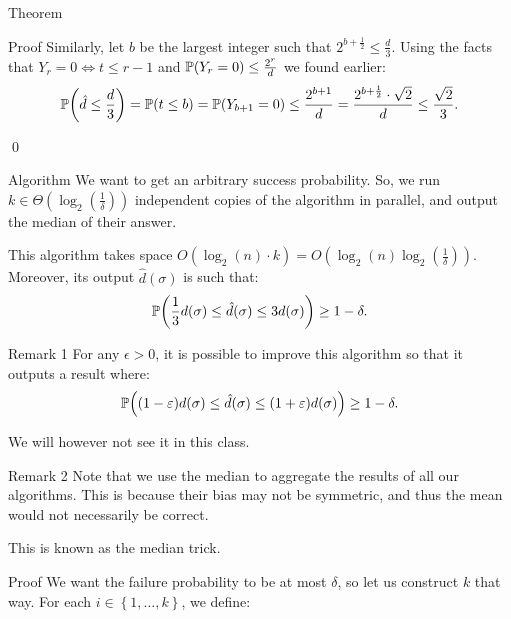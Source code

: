 \documentclass[a4paper]{article}
\begin{document}
\begin{parag}{Theorem}
\begin{subparag}{Proof}
        Similarly, let $b$ be the largest integer such that $2^{b + \frac{1}{2}} \leq \frac{d}{3}$. Using the facts that $Y_r = 0 \iff t \leq r -1$ and $\prob\left(Y_r = 0\right) \leq \frac{2^r}{d}$ we found earlier: 
        \[\prob\left(\hat{d} \leq \frac{d}{3}\right) = \prob\left(t \leq b\right) = \prob\left(Y_{b+1} = 0\right) \leq \frac{2^{b+1}}{d} = \frac{2^{b + \frac{1}{2}} \cdot \sqrt{2}}{d} \leq \frac{\sqrt{2}}{3}.\]

        \qed
    \end{subparag}
\end{parag}

\begin{parag}{Algorithm}
    We want to get an arbitrary success probability. So, we run $k \in \Theta\left(\log_2\left(\frac{1}{\delta}\right)\right)$ independent copies of the algorithm in parallel, and output the median of their answer.

    This algorithm takes space $O\left(\log_2\left(n\right)\cdot k\right) = O\left(\log_2\left(n\right) \log_2\left(\frac{1}{\delta}\right)\right)$. Moreover, its output $\hat{d}\left(\sigma\right)$ is such that: 
    \[\prob\left(\frac{1}{3} d\left(\sigma\right) \leq \hat{d}\left(\sigma\right) \leq 3 d\left(\sigma\right)\right) \geq 1- \delta.\]
    
    \begin{subparag}{Remark 1}
        For any $\epsilon > 0$, it is possible to improve this algorithm so that it outputs a result where:
        \[\prob\left(\left(1 - \epsilon\right) d\left(\sigma\right) \leq \hat{d}\left(\sigma\right) \leq \left(1 + \epsilon\right) d\left(\sigma\right)\right) \geq 1- \delta.\]

        We will however not see it in this class.
    \end{subparag}

    \begin{subparag}{Remark 2}
        Note that we use the median to aggregate the results of all our algorithms. This is because their bias may not be symmetric, and thus the mean would not necessarily be correct.

        This is known as the median trick.
    \end{subparag}

    \begin{subparag}{Proof}
        We want the failure probability to be at most $\delta$, so let us construct $k$ that way. For each $i \in \left\{1, \ldots, k\right\}$, we define: 


\end{subparag}
\end{parag}
\end{document}
